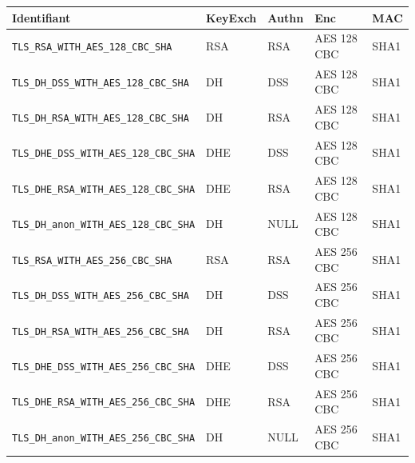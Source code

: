 \documentclass[a4paper,11pt,french]{article}
\begin{document}
\begin{center}
\begin{tabularx}{17cm}{|l|l|l|X|l|}
\hline
\textbf{Identifiant} & \textbf{KeyExch} & \textbf{Authn}& \textbf{Enc}& \textbf{MAC}\\
\hline
\verb+TLS_RSA_WITH_AES_128_CBC_SHA+&RSA&RSA&AES 128 CBC&SHA1\\
\hline
\verb+TLS_DH_DSS_WITH_AES_128_CBC_SHA+&DH&DSS&AES 128 CBC&SHA1\\
\hline 
\verb+TLS_DH_RSA_WITH_AES_128_CBC_SHA+&DH&RSA&AES 128 CBC&SHA1\\
\hline 
\verb+TLS_DHE_DSS_WITH_AES_128_CBC_SHA+&DHE&DSS&AES 128 CBC&SHA1\\
\hline
\verb+TLS_DHE_RSA_WITH_AES_128_CBC_SHA+&DHE&RSA&AES 128 CBC&SHA1\\
\hline
\verb+TLS_DH_anon_WITH_AES_128_CBC_SHA+ &DH&NULL&AES 128 CBC&SHA1\\
\hline
\verb+TLS_RSA_WITH_AES_256_CBC_SHA+&RSA&RSA&AES 256 CBC&SHA1 \\
\hline
\verb+TLS_DH_DSS_WITH_AES_256_CBC_SHA+& DH&DSS&AES 256 CBC&SHA1\\
\hline
\verb+TLS_DH_RSA_WITH_AES_256_CBC_SHA+&DH&RSA&AES 256 CBC&SHA1\\
\hline
\verb+TLS_DHE_DSS_WITH_AES_256_CBC_SHA+& DHE&DSS&AES 256 CBC&SHA1\\
\hline
\verb+TLS_DHE_RSA_WITH_AES_256_CBC_SHA+& DHE&RSA&AES 256 CBC&SHA1\\
\hline
\verb+TLS_DH_anon_WITH_AES_256_CBC_SHA+& DH&NULL&AES 256 CBC&SHA1\\
\hline
\end{tabularx}
\end{center}
\end{document}
